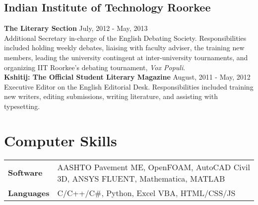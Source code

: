 \documentclass[12pt]{article}
\begin{document}
\subsection*{Indian Institute of Technology Roorkee}
\textbf{The Literary Section} \hfill July, 2012 - May, 2013\\
Additional Secretary in-charge of the English Debating Society. Responsibilities included holding weekly debates, liaising with faculty adviser, the training new members, leading the university contingent at inter-university tournaments, and organizing IIT Roorkee's debating tournament, \textit{Vox Populi}. \\

\textbf{Kshitij: The Official Student Literary Magazine} \hfill August, 2011 - May, 2012\\
Executive Editor on the English Editorial Desk. Responsibilities included training new writers, editing submissions, writing literature, and assisting with typesetting. \\

\section*{Computer Skills}
\begin{tabular}{p{10em} p{25em}} %
\textbf{Software} & AASHTO Pavement ME, OpenFOAM, AutoCAD Civil 3D, ANSYS FLUENT, Mathematica, MATLAB \\
\textbf{Languages} & C/C++/C\#, Python, Excel VBA, HTML/CSS/JS
\end{tabular}
\end{document}
